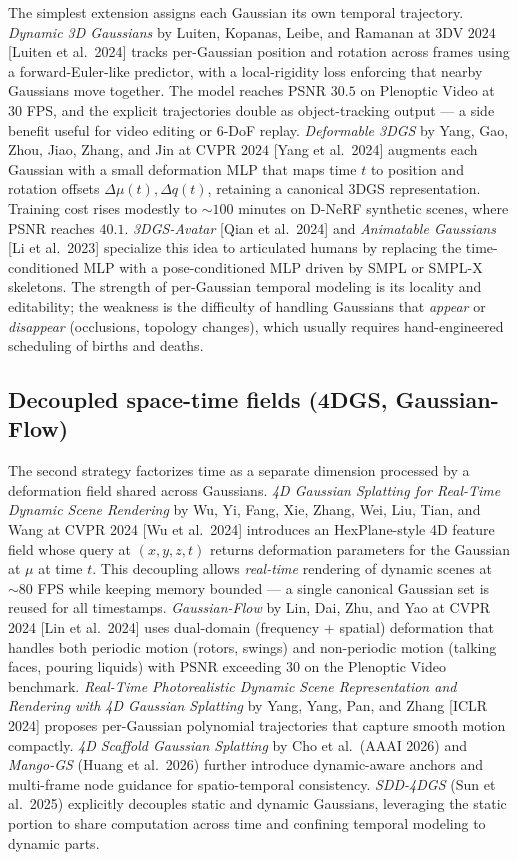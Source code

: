 The simplest extension assigns each Gaussian its own temporal trajectory. \emph{Dynamic 3D Gaussians} by Luiten, Kopanas, Leibe, and Ramanan at 3DV \(2024\) {[}Luiten et al.~2024{]} tracks per-Gaussian position and rotation across frames using a forward-Euler-like predictor, with a local-rigidity loss enforcing that nearby Gaussians move together. The model reaches PSNR \(30.5\) on Plenoptic Video at \(30\) FPS, and the explicit trajectories double as object-tracking output --- a side benefit useful for video editing or 6-DoF replay. \emph{Deformable 3DGS} by Yang, Gao, Zhou, Jiao, Zhang, and Jin at CVPR \(2024\) {[}Yang et al.~2024{]} augments each Gaussian with a small deformation MLP that maps time \(t\) to position and rotation offsets \(\Delta\mu(t),\Delta q(t)\), retaining a canonical 3DGS representation. Training cost rises modestly to \(\sim\!100\) minutes on D-NeRF synthetic scenes, where PSNR reaches \(40.1\). \emph{3DGS-Avatar} {[}Qian et al.~2024{]} and \emph{Animatable Gaussians} {[}Li et al.~2023{]} specialize this idea to articulated humans by replacing the time-conditioned MLP with a pose-conditioned MLP driven by SMPL or SMPL-X skeletons. The strength of per-Gaussian temporal modeling is its locality and editability; the weakness is the difficulty of handling Gaussians that \emph{appear} or \emph{disappear} (occlusions, topology changes), which usually requires hand-engineered scheduling of births and deaths.

\subsection{Decoupled space-time fields (4DGS, Gaussian-Flow)}\label{decoupled-space-time-fields-4dgs-gaussian-flow}

The second strategy factorizes time as a separate dimension processed by a deformation field shared across Gaussians. \emph{4D Gaussian Splatting for Real-Time Dynamic Scene Rendering} by Wu, Yi, Fang, Xie, Zhang, Wei, Liu, Tian, and Wang at CVPR 2024 {[}Wu et al.~2024{]} introduces an HexPlane-style 4D feature field whose query at \((x,y,z,t)\) returns deformation parameters for the Gaussian at \(\mu\) at time \(t\). This decoupling allows \emph{real-time} rendering of dynamic scenes at \(\sim 80\) FPS while keeping memory bounded --- a single canonical Gaussian set is reused for all timestamps. \emph{Gaussian-Flow} by Lin, Dai, Zhu, and Yao at CVPR 2024 {[}Lin et al.~2024{]} uses dual-domain (frequency + spatial) deformation that handles both periodic motion (rotors, swings) and non-periodic motion (talking faces, pouring liquids) with PSNR exceeding \(30\) on the Plenoptic Video benchmark. \emph{Real-Time Photorealistic Dynamic Scene Representation and Rendering with 4D Gaussian Splatting} by Yang, Yang, Pan, and Zhang {[}ICLR 2024{]} proposes per-Gaussian polynomial trajectories that capture smooth motion compactly. \emph{4D Scaffold Gaussian Splatting} by Cho et al.~(AAAI 2026) and \emph{Mango-GS} (Huang et al.~2026) further introduce dynamic-aware anchors and multi-frame node guidance for spatio-temporal consistency. \emph{SDD-4DGS} (Sun et al.~2025) explicitly decouples static and dynamic Gaussians, leveraging the static portion to share computation across time and confining temporal modeling to dynamic parts.

